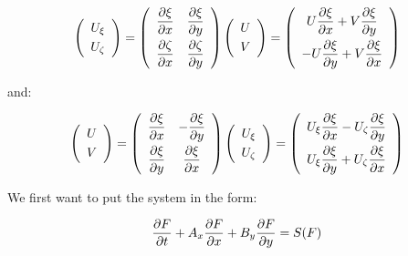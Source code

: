 \begin{equation*}
\left( 
\begin{array}{c}
U_{\xi } \smallskip\\ 
U_{\zeta }%
\end{array}
\right) =\left( 
\begin{array}{cc}
\dfrac{\partial \xi }{\partial x} & \dfrac{\partial \xi }{\partial y} \smallskip\\ 
\dfrac{\partial \zeta }{\partial x} & \dfrac{\partial \zeta }{\partial y}%
\end{array}
\right) \left( 
\begin{array}{c}
U \smallskip\\ 
V%
\end{array}
\right) =\left( 
\begin{array}{c}
U\dfrac{\partial \xi }{\partial x}+V\dfrac{\partial \xi }{\partial y} \smallskip\\ 
-U\dfrac{\partial \xi }{\partial y}+V\dfrac{\partial \xi }{\partial x}%
\end{array}
\right)
\end{equation*}

and:

\begin{equation*}
\left( 
\begin{array}{c}
U \smallskip\\ 
V%
\end{array}
\right) =\left( 
\begin{array}{cc}
\dfrac{\partial \xi }{\partial x} & -\dfrac{\partial \xi }{\partial y} \smallskip\\ 
\dfrac{\partial \xi }{\partial y} & \dfrac{\partial \xi }{\partial x}%
\end{array}
\right) \left( 
\begin{array}{c}
U_{\xi } \smallskip\\ 
U_{\zeta }%
\end{array}
\right) =\left( 
\begin{array}{c}
U_{\xi }\dfrac{\partial \xi }{\partial x}-U_{\zeta }\dfrac{\partial \xi }{%
\partial y} \smallskip\\ 
U_{\xi }\dfrac{\partial \xi }{\partial y}+U_{\zeta }\dfrac{\partial \xi }{%
\partial x}%
\end{array}
\right)
\end{equation*}

We first want to put the system in the form:

\begin{equation}
\dfrac{\partial F}{\partial t}+A_{x}\dfrac{\partial F}{\partial x}+B_{y}\dfrac{%
\partial F}{\partial y}=S(F)  \label{svtsyst}
\end{equation}

